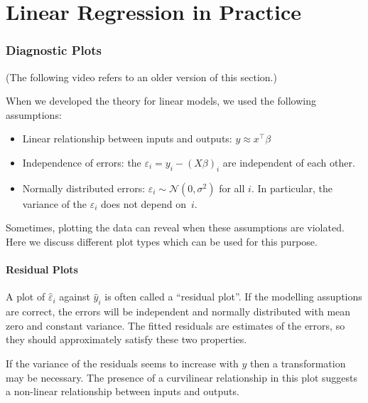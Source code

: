 \documentclass[
  a4paper,
]{article}
\theoremstyle{definition}
\theoremstyle{definition}
\theoremstyle{definition}
\theoremstyle{definition}
\theoremstyle{remark}
\begin{document}
\clearpage

\part{Linear Regression in Practice}\label{part-linear-regression-in-practice}

\clearpage

\section{Diagnostic Plots}\label{S09-plots}

(The following video refers to an older version of this section.)

When we developed the theory for linear models, we used the following
assumptions:

\begin{itemize}
\item
  Linear relationship between inputs and outputs: \(y \approx x^\top \beta\)
\item
  Independence of errors: the \(\varepsilon_i = y_i - (X\beta)_i\) are independent
  of each other.
\item
  Normally distributed errors: \(\varepsilon_i \sim \mathcal{N}(0, \sigma^2)\) for all \(i\).
  In particular, the variance of the \(\varepsilon_i\) does not depend on~\(i\).
\end{itemize}

Sometimes, plotting the data can reveal when these assumptions are violated.
Here we discuss different plot types which can be used for this purpose.

\subsection{Residual Plots}\label{residual-plots}

A plot of \(\hat\varepsilon_i\) against \(\hat y_i\) is often called a ``residual plot''.
If the modelling assuptions are correct, the errors will be independent
and normally distributed with mean zero and constant variance. The fitted
residuals are estimates of the errors, so they should approximately satisfy
these two properties.

If the variance of the residuals seems to increase with \(\hat y\) then a
transformation may be necessary. The presence of a curvilinear relationship in
this plot suggests a non-linear relationship between inputs and outputs.
\end{document}
